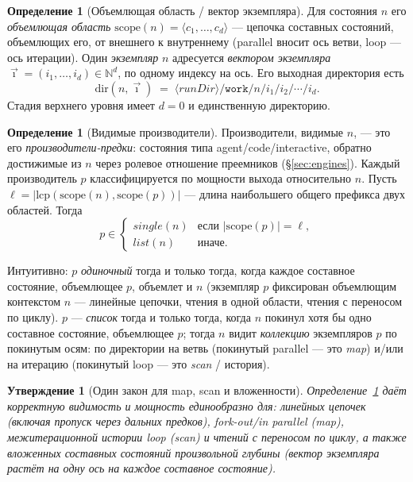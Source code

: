 \documentclass[11pt]{article}
\theoremstyle{plain}
\newtheorem{proposition}[theorem]{Утверждение}
\theoremstyle{definition}
\newtheorem{definition}[theorem]{Определение}
\theoremstyle{remark}
\newcommand{\code}[1]{\texttt{#1}}
\newcommand{\state}[1]{\textsf{#1}}
\newcommand{\Nat}{\mathbb{N}}
\begin{document}
\begin{definition}[Объемлющая область / вектор экземпляра]\label{def:scope}
Для состояния $n$ его \emph{объемлющая область} $\mathrm{scope}(n) = \langle c_1,
\dots, c_d \rangle$ --- цепочка составных состояний, объемлющих его, от внешнего к
внутреннему (\state{parallel} вносит ось ветви, \state{loop} --- ось итерации). Один
\emph{экземпляр} $n$ адресуется \emph{вектором экземпляра} $\vec{\imath} = (i_1, \dots,
i_d) \in \Nat^d$, по одному индексу на ось. Его выходная директория есть
\[
  \mathrm{dir}(n, \vec{\imath}) \;=\; \langle\mathit{runDir}\rangle/\code{work}/n/i_1/i_2/\cdots/i_d .
\]
Стадия верхнего уровня имеет $d = 0$ и единственную директорию.
\end{definition}

\begin{definition}[Видимые производители]\label{def:visible}
Производители, видимые $n$, --- это его \emph{производители-предки}: состояния типа
\state{agent}/\state{code}/\state{interactive}, обратно достижимые из $n$ через
ролевое отношение преемников (\S\ref{sec:engines}). Каждый производитель $p$
классифицируется по мощности выхода относительно $n$. Пусть $\ell =
|\mathrm{lcp}(\mathrm{scope}(n),\mathrm{scope}(p))|$ --- длина наибольшего общего
префикса двух областей. Тогда
\[
  p \in
  \begin{cases}
    \mathit{single}(n) & \text{если } |\mathrm{scope}(p)| = \ell, \\[2pt]
    \mathit{list}(n)   & \text{иначе.}
  \end{cases}
\]
\end{definition}

Интуитивно: $p$ \emph{одиночный} тогда и только тогда, когда каждое составное состояние,
объемлющее $p$, объемлет и $n$ (экземпляр $p$ фиксирован объемлющим контекстом $n$ ---
линейные цепочки, чтения в одной области, чтения с переносом по циклу). $p$ ---
\emph{список} тогда и только тогда, когда $n$ покинул хотя бы одно составное состояние,
объемлющее $p$; тогда $n$ видит \emph{коллекцию} экземпляров $p$ по покинутым осям: по
директории на ветвь (покинутый \state{parallel} --- это \emph{map}) и/или на итерацию
(покинутый \state{loop} --- это \emph{scan} / история).

\begin{proposition}[Один закон для map, scan и вложенности]
Определение~\ref{def:visible} даёт корректную видимость и мощность единообразно для:
линейных цепочек (включая пропуск через дальних предков), fork-out/in \state{parallel}
(map), межитерационной истории \state{loop} (scan) и чтений с переносом по циклу, а также
вложенных составных состояний произвольной глубины (вектор экземпляра растёт на одну ось
на каждое составное состояние).
\end{proposition}
\end{document}
